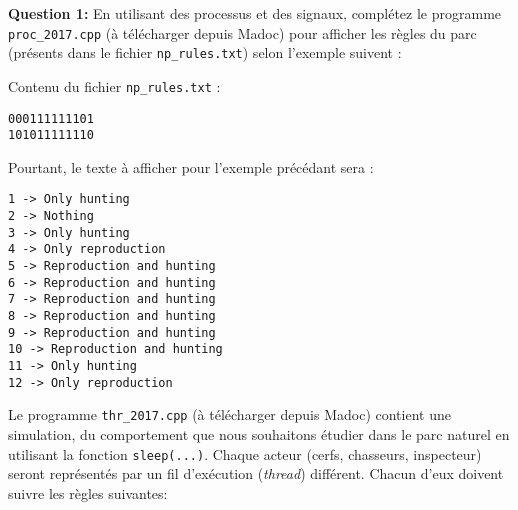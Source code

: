 \documentclass[CC,sansRappel,12pt]{tdtp-utf8}
\begin{document}
\begin{feuille}
\begin{exercice}
\textbf{Question 1:} En utilisant des processus et des signaux, complétez le programme \texttt{proc\_2017.cpp} (à télécharger depuis {\sc Madoc}) pour afficher les règles du parc (présents dans le fichier \texttt{np\_rules.txt}) selon l'exemple suivent :
\vspace{10pt}

Contenu du fichier \texttt{np\_rules.txt} :
\begin{Verbatim}
000111111101 
101011111110 
\end{Verbatim}

Pourtant, le texte à afficher pour l'exemple précédant sera :

\begin{Verbatim}
1 -> Only hunting 
2 -> Nothing
3 -> Only hunting 
4 -> Only reproduction
5 -> Reproduction and hunting 
6 -> Reproduction and hunting 
7 -> Reproduction and hunting 
8 -> Reproduction and hunting 
9 -> Reproduction and hunting 
10 -> Reproduction and hunting 
11 -> Only hunting 
12 -> Only reproduction
\end{Verbatim}

\end{exercice}

\begin{exercice}

Le programme \texttt{thr\_2017.cpp} (à télécharger depuis {\sc Madoc}) contient une simulation, du comportement que nous souhaitons étudier dans le parc naturel en utilisant la fonction \texttt{sleep(...)}. Chaque acteur (cerfs, chasseurs, inspecteur) seront représentés par un fil d'exécution (\textit{thread}) différent. Chacun d'eux doivent suivre les règles suivantes:


\end{exercice}
\end{feuille}
\end{document}
